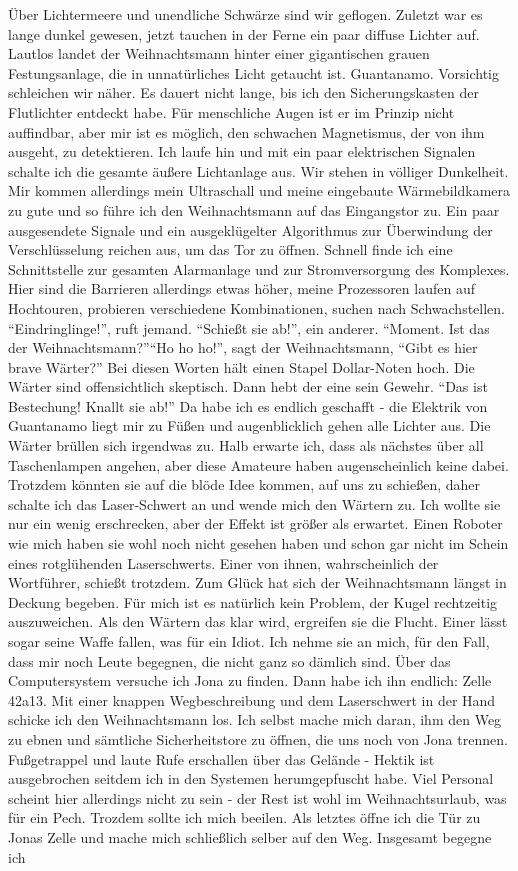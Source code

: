 Über Lichtermeere und unendliche Schwärze sind wir geflogen. Zuletzt war es lange dunkel gewesen, jetzt tauchen in der Ferne ein paar diffuse Lichter auf. Lautlos landet der Weihnachtsmann hinter einer gigantischen grauen Festungsanlage, die in unnatürliches Licht getaucht ist. Guantanamo. Vorsichtig schleichen wir näher.  Es dauert nicht lange, bis ich den Sicherungskasten der Flutlichter entdeckt habe. Für menschliche Augen ist er im Prinzip nicht auffindbar, aber mir ist es möglich, den schwachen Magnetismus, der von ihm ausgeht, zu detektieren. Ich laufe hin und mit ein paar elektrischen Signalen schalte ich die gesamte äußere Lichtanlage aus. Wir stehen in völliger Dunkelheit. Mir kommen allerdings mein Ultraschall und meine eingebaute Wärmebildkamera zu gute und so führe ich den Weihnachtsmann auf das Eingangstor zu. Ein paar ausgesendete Signale und ein ausgeklügelter Algorithmus zur Überwindung der Verschlüsselung reichen aus, um das Tor zu öffnen. Schnell finde ich eine Schnittstelle zur gesamten Alarmanlage und zur Stromversorgung des Komplexes. Hier sind die Barrieren allerdings etwas höher, meine Prozessoren laufen auf Hochtouren, probieren verschiedene Kombinationen, suchen nach Schwachstellen. "`Eindringlinge!"', ruft jemand. "`Schießt sie ab!"', ein anderer. "`Moment. Ist das der Weihnachtsmann?"'"`Ho ho ho!"', sagt der Weihnachtsmann, "`Gibt es hier brave Wärter?"' Bei diesen Worten hält einen Stapel Dollar-Noten hoch. Die Wärter sind offensichtlich skeptisch. Dann hebt der eine sein Gewehr. "`Das ist Bestechung! Knallt sie ab!"' Da habe ich es endlich geschafft - die Elektrik von Guantanamo liegt mir zu Füßen und augenblicklich gehen alle Lichter aus. Die Wärter brüllen sich irgendwas zu. Halb erwarte ich, dass als nächstes über all Taschenlampen angehen, aber diese Amateure haben augenscheinlich keine dabei. Trotzdem könnten sie auf die blöde Idee kommen, auf uns zu schießen, daher schalte ich das Laser-Schwert an und wende mich den Wärtern zu. Ich wollte sie nur ein wenig erschrecken, aber der Effekt ist größer als erwartet. Einen Roboter wie mich haben sie wohl noch nicht gesehen haben und schon gar nicht im Schein eines rotglühenden Laserschwerts. Einer von ihnen, wahrscheinlich der Wortführer, schießt trotzdem. Zum Glück hat sich der Weihnachtsmann längst in Deckung begeben. Für mich ist es natürlich kein Problem, der Kugel rechtzeitig auszuweichen. Als den Wärtern das klar wird, ergreifen sie die Flucht. Einer lässt sogar seine Waffe fallen, was für ein Idiot. Ich nehme sie an mich, für den Fall, dass mir noch Leute begegnen, die nicht ganz so dämlich sind. Über das Computersystem versuche ich Jona zu finden. Dann habe ich ihn endlich: Zelle 42a13. Mit einer knappen Wegbeschreibung und dem Laserschwert in der Hand schicke ich den Weihnachtsmann los. Ich selbst mache mich daran, ihm den Weg zu ebnen und sämtliche Sicherheitstore zu öffnen, die uns noch von Jona trennen. Fußgetrappel und laute Rufe erschallen über das Gelände - Hektik ist ausgebrochen seitdem ich in den Systemen herumgepfuscht habe. Viel Personal scheint hier allerdings nicht zu sein - der Rest ist wohl im Weihnachtsurlaub, was für ein Pech. Trozdem sollte ich mich beeilen. Als letztes öffne ich die Tür zu Jonas Zelle und mache mich schließlich selber auf den Weg. Insgesamt begegne ich 